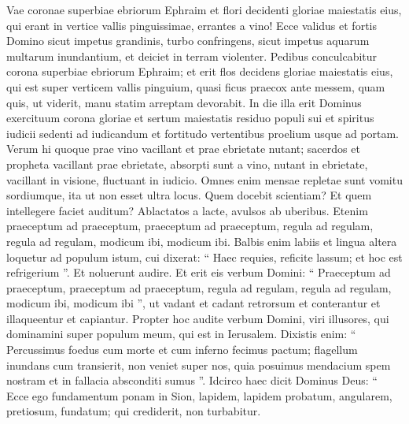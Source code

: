 \begin{biblechapter}
\begin{biblechapter}
\begin{biblechapter}
\begin{biblechapter}
\begin{biblechapter}
\begin{biblechapter}
\begin{biblechapter}
\begin{biblechapter}
\begin{biblechapter}
\begin{biblechapter}
\begin{biblechapter}
\begin{biblechapter}
\begin{biblechapter}
\begin{biblechapter}
\begin{biblechapter}
\begin{biblechapter}
\begin{biblechapter}
\begin{biblechapter}
\begin{biblechapter}
\begin{biblechapter}
\begin{biblechapter}
\begin{biblechapter}
\begin{biblechapter}
\begin{biblechapter}
\begin{biblechapter}
\begin{biblechapter}
\begin{biblechapter}
\begin{biblechapter}
\verse Vae coronae superbiae ebriorum Ephraim
 et flori decidenti gloriae maiestatis eius,
 qui erant in vertice vallis pinguissimae,
 errantes a vino!
 \verse Ecce validus et fortis Domino
 sicut impetus grandinis, turbo confringens,
 sicut impetus aquarum multarum inundantium,
 et deiciet in terram violenter.
 \verse Pedibus conculcabitur
 corona superbiae ebriorum Ephraim;
 \verse et erit flos decidens gloriae maiestatis eius,
 qui est super verticem vallis pinguium,
 quasi ficus praecox ante messem,
 quam quis, ut viderit,
 manu statim arreptam devorabit.
 \verse In die illa erit Dominus exercituum
 corona gloriae
 et sertum maiestatis
 residuo populi sui
 \verse et spiritus iudicii
 sedenti ad iudicandum
 et fortitudo
 vertentibus proelium usque ad portam.
 \verse Verum hi quoque prae vino vacillant
 et prae ebrietate nutant;
 sacerdos et propheta vacillant prae ebrietate,
 absorpti sunt a vino,
 nutant in ebrietate,
 vacillant in visione,
 fluctuant in iudicio.
 \verse Omnes enim mensae repletae sunt vomitu sordiumque,
 ita ut non esset ultra locus.
 \verse Quem docebit scientiam?
 Et quem intellegere faciet auditum?
 Ablactatos a lacte,
 avulsos ab uberibus.
 \verse Etenim praeceptum ad praeceptum, praeceptum ad praeceptum,
 regula ad regulam, regula ad regulam,
 modicum ibi, modicum ibi.
 \verse Balbis enim labiis et lingua altera
 loquetur ad populum istum,
 \verse cui dixerat: “ Haec requies, reficite lassum;
 et hoc est refrigerium ”.
 Et noluerunt audire.
 \verse Et erit eis verbum Domini:
 “ Praeceptum ad praeceptum, praeceptum ad praeceptum,
 regula ad regulam, regula ad regulam,
 modicum ibi, modicum ibi ”,
 ut vadant et cadant retrorsum et conterantur
 et illaqueentur et capiantur.
 \verse Propter hoc audite verbum Domini,
 viri illusores, qui dominamini super populum meum,
 qui est in Ierusalem.
 \verse Dixistis enim: “ Percussimus foedus cum morte
 et cum inferno fecimus pactum;
 flagellum inundans cum transierit,
 non veniet super nos,
 quia posuimus mendacium spem nostram
 et in fallacia absconditi sumus ”.
 \verse Idcirco haec dicit Dominus Deus:
 “ Ecce ego fundamentum ponam in Sion, lapidem,
 lapidem probatum, angularem, pretiosum, fundatum;
 qui crediderit, non turbabitur.

\end{biblechapter}
\end{biblechapter}
\end{biblechapter}
\end{biblechapter}
\end{biblechapter}
\end{biblechapter}
\end{biblechapter}
\end{biblechapter}
\end{biblechapter}
\end{biblechapter}
\end{biblechapter}
\end{biblechapter}
\end{biblechapter}
\end{biblechapter}
\end{biblechapter}
\end{biblechapter}
\end{biblechapter}
\end{biblechapter}
\end{biblechapter}
\end{biblechapter}
\end{biblechapter}
\end{biblechapter}
\end{biblechapter}
\end{biblechapter}
\end{biblechapter}
\end{biblechapter}
\end{biblechapter}
\end{biblechapter}
